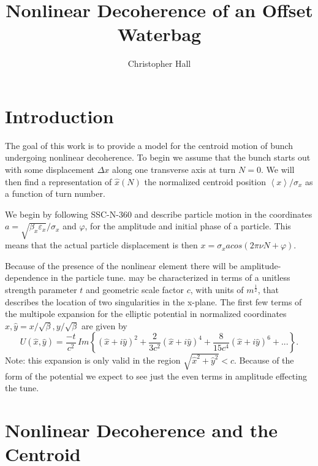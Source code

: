 \documentclass[]{article}
\title{Nonlinear Decoherence of an Offset Waterbag}
\author{Christopher Hall}
\begin{document}
\maketitle

\begin{abstract}

\end{abstract}

\section{Introduction}

The goal of this work is to provide a model for the centroid motion of bunch undergoing 
nonlinear decoherence. To begin we assume that the bunch starts out with some 
displacement $\Delta x$ along one transverse axis at turn $N=0$. We will then find a 
representation of  $\hat{x}(N)$ the normalized centroid position $\left\langle x 
\right\rangle 
/ \sigma_x$ as a function of turn number. 

We begin by following SSC-N-360 and describe particle motion in the coordinates $ a = 
\sqrt{\beta_x \varepsilon_x} / \sigma_x$ and $\varphi$, for the amplitude and initial phase 
of a 
particle. This means that the actual particle displacement is then $x = \sigma_x a cos(2 \pi 
\nu N + \varphi)$. 

Because of the presence of the nonlinear element there will be amplitude-dependence in 
the particle tune. may be characterized in terms of
a unitless strength parameter $t$ and geometric scale factor $c$, with units of
$m^\frac{1}{2}$, that describes the location of two singularities in the x-plane. The first
few terms of the multipole expansion for the elliptic potential in normalized coordinates
$\hat{x}, \hat{y} = x / \sqrt{\beta}, y / \sqrt{\beta}$ are given by %
\begin{equation} \label{eq:expansion}
U(\hat{x}, \hat{y}) = \frac{-t}{c^2} \, Im\left\lbrace (\hat{x}+i\hat{y})^2 +
\frac{2}{3c^2}(\hat{x} + i\hat{y})^4 + \right.
\left. \frac{8}{15c^4}(\hat{x}+i\hat{y})^6 + ... \right\rbrace.
\end{equation}
Note: this expansion is only valid in the region $\sqrt{\hat{x}^2 +\hat{y}^2} < c$. Because 
of the form of the potential we expect to see just the even 
terms in amplitude effecting the tune.

\section{Nonlinear Decoherence and the Centroid}
\end{document}
